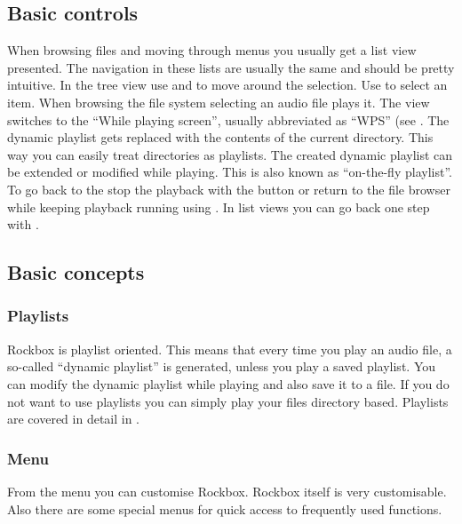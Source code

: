 \subsection{Basic controls}
When browsing files and moving through menus you usually get a list view
presented. The navigation in these lists are usually the same and should be
pretty intuitive.
In the tree view use \ActionStdNext{} and \ActionStdPrev{} to move around
the selection. Use \ActionStdOk{} to select an item. 
When browsing the file system selecting an audio file plays it. The view
switches to the ``While playing screen'', usually abbreviated as ``WPS'' (see
. The dynamic playlist gets replaced with the contents of
the current directory. This way you can easily treat directories as playlists.
The created dynamic playlist can be extended or modified while playing. This is
also known as ``on-the-fly playlist''.
To go back to the  stop the playback with the
\ActionWpsStop{} button or return to the file browser while keeping playback
running using \ActionWpsBrowse{}.
In list views you can go back one step with \ActionTreeParentDirectory.

\subsection{Basic concepts}
\subsubsection{Playlists}
Rockbox is playlist oriented. This means that every time you play an audio file,
a so-called ``dynamic playlist'' is generated, unless you play a saved
playlist. You can modify the dynamic playlist while playing and also save
it to a file. If you do not want to use playlists you can simply play your
files directory based.
Playlists are covered in detail in .

\subsubsection{Menu}
From the menu you can customise Rockbox. Rockbox itself is very customisable.
Also there are some special menus for quick access to frequently used
functions.

